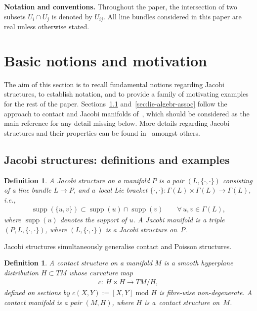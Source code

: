 \documentclass[10pt,a4paper]{amsart}
\numberwithin{equation}{section}
\newtheorem{Definition}[Theorem]{Definition}
\begin{document}
{\bf Notation and conventions.} Throughout the paper, the intersection of two subsets $U_i \cap U_j$ is denoted by $U_{ij}$. All line bundles considered in this paper are real unless otherwise stated.

\section{Basic notions and motivation} \label{sec:motiv-mult-free}
The aim of this section is to recall fundamental notions regarding Jacobi structures, to establish notation, and to provide a family of motivating examples for the rest of the paper. Sections~\ref{sec:basic-notions} and~\ref{sec:lie-algebr-assoc} follow the approach to contact and Jacobi manifolds of~\cite{Maria-Crainic}, which should be considered as the main reference for any detail missing below. More details regarding Jacobi structures and their properties can be found in~\cite{jacobi,Dazord-Lich-Marle91,Lichnerowicz,Kirillov} amongst others.

\subsection{Jacobi structures: def\/initions and examples}\label{sec:basic-notions}
\begin{Definition}\label{defn:jacobi_structure} A {\it Jacobi structure} on a manifold $P$ is a pair $(L,\{\cdot,\cdot\})$ consisting of a line bundle $L\to P$, and a~{\em local} Lie bracket $\{\cdot,\cdot\} \colon \Gamma(L) \times \Gamma(L) \to \Gamma(L)$, i.e.,
\begin{gather*}
 \operatorname{supp}(\{u,v\})\subset \operatorname{supp}(u)\cap \operatorname{supp} (v)\qquad \forall \, u,v\in\Gamma(L),
\end{gather*}
where $\operatorname{supp}(u)$ denotes the support of $u$. A {\it Jacobi manifold} is a triple $(P,L,\{\cdot,\cdot\})$, where $(L,\{\cdot,\cdot\})$ is a Jacobi structure on~$P$.
\end{Definition}

Jacobi structures simultaneously generalise contact and Poisson structures.

\begin{Definition}\label{defn:contact_structure} A {\it contact structure} on a manifold $M$ is a smooth hyperplane distribution $H\subset TM$ whose curvature map
 \begin{gather}\label{curvature}
 c\colon \ H\times H\to T M/H,
 \end{gather}
def\/ined on sections by $c(X,Y):=[X,Y] \text{ mod } H$ is f\/ibre-wise non-degenerate. A {\it contact manifold} is a pair $(M,H)$, where $H$ is a~contact structure on~$M$.
\end{Definition}
\end{document}

